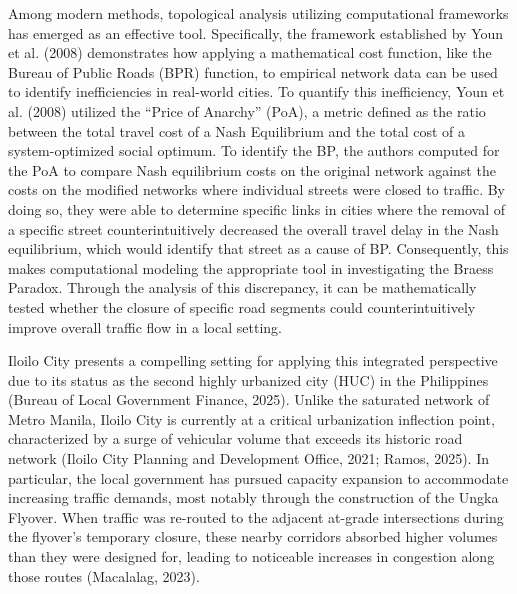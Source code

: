 Among modern methods, topological analysis utilizing computational frameworks has emerged as an effective tool. Specifically, the framework established by Youn et al. (2008) demonstrates how applying a mathematical cost function, like the Bureau of Public Roads (BPR) function, to empirical network data can be used to identify inefficiencies in real-world cities. To quantify this inefficiency, Youn et al. (2008) utilized the “Price of Anarchy” (PoA), a metric defined as the ratio between the total travel cost of a Nash Equilibrium and the total cost of a system-optimized social optimum. To identify the BP, the authors computed for the PoA to compare Nash equilibrium costs on the original network against the costs on the modified networks where individual streets were closed to traffic. By doing so, they were able to determine specific links in cities where the removal of a specific street counterintuitively decreased the overall travel delay in the Nash equilibrium, which would identify that street as a cause of BP. Consequently, this makes computational modeling the appropriate tool in investigating the Braess Paradox. Through the analysis of this discrepancy, it can be mathematically tested whether the closure of specific road segments could counterintuitively improve overall traffic flow in a local setting. 
    
Iloilo City presents a compelling setting for applying this integrated perspective due to its status as the second highly urbanized city (HUC) in the Philippines (Bureau of Local Government Finance, 2025). Unlike the saturated network of Metro Manila, Iloilo City is currently at a critical urbanization inflection point, characterized by a surge of vehicular volume that exceeds its historic road network (Iloilo City Planning and Development Office, 2021; Ramos, 2025). In particular, the local government has pursued capacity expansion to accommodate increasing traffic demands, most notably through the construction of the Ungka Flyover. When traffic was re-routed to the adjacent at-grade intersections during the flyover's temporary closure, these nearby corridors absorbed higher volumes than they were designed for, leading to noticeable increases in congestion along those routes (Macalalag, 2023).

